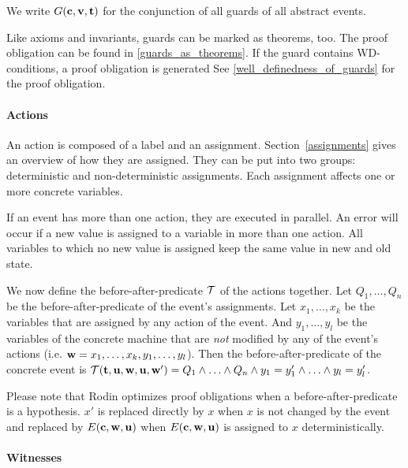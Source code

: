 We write $G(\mathbf{c},\mathbf{v},\mathbf{t})$ for the conjunction of all guards of all abstract events.

Like axioms and invariants, guards can be marked as theorems, too. 
The proof obligation can be found in \ref{guards_as_theorems}.
If the guard contains WD-conditions, a proof obligation is generated
See \ref{well_definedness_of_guards} for the proof obligation.

\paragraph{Actions}
\label{actions}
An action is composed of a label and an assignment.
Section~\ref{assignments} gives an overview of how they are assigned.
They can be put into two groups: deterministic and non-deterministic assignments.
Each assignment affects one or more concrete variables.

If an event has more than one action, they are executed in parallel. 
An error will occur if a new value is assigned to a variable in more than one action.
All variables to which no new value is assigned keep the same value in new and old state.

We now define the before-after-predicate $\mathcal{T}$ of the actions together.
Let $Q_1,\ldots,Q_n$ be the before-after-predicate of the event's assignments. 
Let $x_1,\ldots,x_k$ be the variables that are assigned by any action of the event.
And $y_1,\ldots,y_l$ be the variables of the concrete machine that are \emph{not} modified by any of 
 the event's actions (i.e. $\mathbf{w} = x_1,\ldots,x_k,y_1,\ldots,y_l$).
Then the before-after-predicate of the concrete event is 
  $\mathcal{T}({\mathbf{t},\mathbf{u}},\mathbf{w},\mathbf{u},\mathbf{w}') = Q_1 \land \ldots \land Q_n \land y_1 = y_1' \land \ldots \land y_l=y_l'$.

Please note that Rodin optimizes proof obligations when a before-after-predicate is a hypothesis.
$x'$ is replaced directly by $x$ when $x$ is not changed by the event and replaced by $E(\mathbf{c},\mathbf{w},\mathbf{u})$
 when $E(\mathbf{c},\mathbf{w},\mathbf{u})$ is assigned to $x$ deterministically.

\paragraph{Witnesses}
\label{witness}


